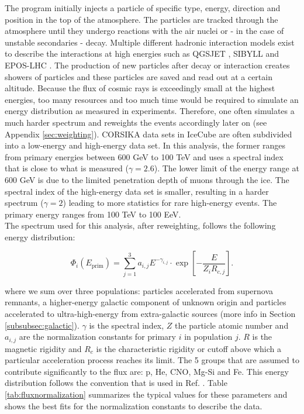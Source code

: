 \noindent The program initially injects a particle of specific type, energy, direction and position in the top of the atmosphere. The particles are tracked through the atmosphere until they undergo reactions with the air nuclei or - in the case of unstable secondaries - decay. Multiple different hadronic interaction models exist to describe the interactions at high energies such as QGSJET \cite{Ostapchenko:2010vb}, SIBYLL \cite{Riehn:2017mfm} and EPOS-LHC \cite{Pierog:2013ria}. The production of new particles after decay or interaction creates showers of particles and these particles are saved and read out at a certain altitude. Because the flux of cosmic rays is exceedingly small at the highest energies, too many resources and too much time would be required to simulate an energy distribution as measured in experiments. Therefore, one often simulates a much harder spectrum and reweights the events accordingly later on (see Appendix \ref{sec:weighting}). CORSIKA data sets in IceCube are often subdivided into a low-energy and high-energy data set. In this analysis, the former ranges from primary energies between 600 GeV to 100 TeV and uses a spectral index that is close to what is measured ($\gamma = 2.6$). The lower limit of the energy range at 600 GeV is due to the limited penetration depth of muons through the ice. The spectral index of the high-energy data set is smaller, resulting in a harder spectrum ($\gamma = 2$) leading to more statistics for rare high-energy events. The primary energy ranges from 100 TeV to 100 EeV.\\

\noindent The spectrum used for this analysis, after reweighting, follows the following energy distribution:

\begin{equation}
\label{eq:gaisser}
\Phi_i \left(E_{\textrm{prim}}\right) = \sum^3_{j=1} a_{i,j} E^{-\gamma_{i,j}} \cdot \exp \left[- \frac{E}{Z_i R_{c,j}}\right].
\end{equation}

\noindent where we sum over three populations: particles accelerated from supernova remnants, a higher-energy galactic component of unknown origin and particles accelerated to ultra-high-energy from extra-galactic sources (more info in Section \ref{subsubsec:galactic}). $\gamma$ is the spectral index, $Z$ the particle atomic number and $a_{i,j}$ are the normalization constants for primary $i$ in population $j$. $R$ is the magnetic rigidity and $R_c$ is the characteristic rigidity or cutoff above which a particular acceleration process reaches its limit. The 5 groups that are assumed to contribute significantly to the flux are: p, He, CNO, Mg-Si and Fe. This energy distribution follows the convention that is used in Ref. \cite{Gaisser:2013bla}. Table \ref{tab:fluxnormalization} summarizes the typical values for these parameters and shows the best fits for the normalization constants to describe the data.

